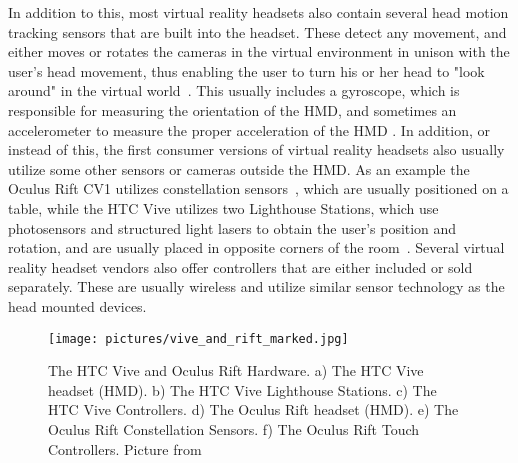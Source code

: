 In addition to this, most virtual reality headsets also contain several head motion tracking sensors that are built into the headset. 
These detect any movement, and either moves or rotates the cameras in the virtual environment in unison with the user's head movement, thus enabling the user to turn
his or her head to "look around" in the virtual world~\citep{TW2016}. This usually includes a gyroscope, which is responsible for measuring the orientation of the
HMD, and sometimes an accelerometer to measure the proper acceleration of the HMD \citep{THEVERGE2016}. In addition, or instead of this, the first consumer versions of 
virtual reality headsets also usually utilize some other sensors or cameras outside the HMD. As an example the Oculus Rift CV1 utilizes constellation sensors~\citep{VRFOCUS2015}, 
which are usually positioned on a table, while the HTC Vive utilizes two Lighthouse Stations, which use photosensors and 
structured light lasers to obtain the user's position and rotation, and are usually placed in opposite corners of the room~\citep{GIZMODO2015}. 
Several virtual reality headset vendors also offer controllers that are either included or sold separately. These are usually wireless and 
utilize similar sensor technology as the head mounted devices.    

\begin{figure}%
	\texttt{[image: pictures/vive\_and\_rift\_marked.jpg]}
	\caption[The HTC Vive and Oculus Rift Hardware]{The HTC Vive and Oculus Rift Hardware. 
    a) The HTC Vive headset (HMD). b) The HTC Vive Lighthouse Stations. c) The HTC Vive Controllers. d) The Oculus Rift headset (HMD). e) The Oculus Rift Constellation Sensors. 
    f) The Oculus Rift Touch Controllers. Picture from \citet{ROADTOVR2016}}
	\label{fig:vive_and_rift_marked}
\end{figure} 


